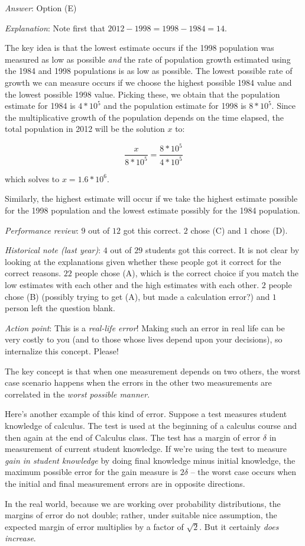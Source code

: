 \documentclass[10pt]{amsart}
\begin{document}
\begin{enumerate}
  {\em Answer}: Option (E)

  {\em Explanation}: Note first that $2012 - 1998 = 1998 - 1984 = 14$.

  The key idea is that the lowest estimate occurs
  if the 1998 population was measured as low as possible {\em and} the
  rate of population growth estimated using the 1984 and 1998
  populations is as low as possible. The lowest possible rate of
  growth we can measure occurs if we choose the highest possible 1984
  value and the lowest possible 1998 value. Picking these, we obtain
  that the population estimate for 1984 is $4 * 10^5$ and the
  population estimate for 1998 is $8 * 10^5$. Since the
  multiplicative growth of the population depends on the time elapsed,
  the total population in 2012 will be the solution $x$ to:

  $$\frac{x}{8 * 10^5} = \frac{8 * 10^5}{4 * 10^5}$$

  which solves to $x = 1.6 * 10^6$.

  Similarly, the highest estimate will occur if we take the highest
  estimate possible for the 1998 population and the lowest estimate
  possibly for the 1984 population.

  {\em Performance review}: $9$ out of $12$ got this correct. $2$
  chose (C) and $1$ chose (D).

  {\em Historical note (last year)}: $4$ out of $29$ students got this
  correct. It is not clear by looking at the explanations given
  whether these people got it correct for the correct reasons. $22$
  people chose (A), which is the correct choice if you match the low
  estimates with each other and the high estimates with each
  other. $2$ people chose (B) (possibly trying to get (A), but made a
  calculation error?) and $1$ person left the question blank.

  {\em Action point}: This is a {\em real-life error}! Making such an
  error in real life can be very costly to you (and to those whose
  lives depend upon your decisions), so internalize this
  concept. Please!

  The key concept is that when one measurement depends on two others,
  the worst case scenario happens when the errors in the other two
  measurements are correlated in the {\em worst possible manner}.

  Here's another example of this kind of error. Suppose a test
  measures student knowledge of calculus. The test is used at the
  beginning of a calculus course and then again at the end of Calculus
  class. The test has a margin of error $\delta$ in measurement of
  current student knowledge. If we're using the test to measure {\em
  gain in student knowledge} by doing final knowledge minus initial
  knowledge, the maximum possible error for the gain measure is
  $2\delta$ -- the worst case occurs when the initial and final
  measurement errors are in opposite directions.

  In the real world, because we are working over probability
  distributions, the margins of error do not double; rather, under
  suitable nice assumption, the expected margin of error multiplies by
  a factor of $\sqrt{2}$. But it certainly {\em does increase}.

\end{enumerate}
\end{document}
